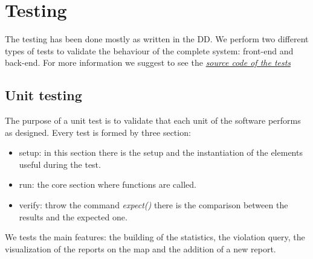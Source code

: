 \documentclass[../ITD.tex]{subfiles}
\begin{document}
    \chapter{Testing}\label{ch:testing}
    The testing has been done mostly as written in the DD. We perform two different types of tests to validate the behaviour of the complete system: front-end and back-end.
    \newline For more information we suggest to see the \href{https://github.com/fedy97/MorrealeMaddesInnocente/tree/master/safe_streets/test}{\emph{source code of the tests}}
    \section{Unit testing}\label{sec:unit-testing}
    The purpose of a unit test is to validate that each unit of the software performs as designed.
    \newline Every test is formed by three section:
    \begin{itemize}
        \item setup: in this section there is the setup and the instantiation of the elements useful during the test.
        \item run: the core section where functions are called.
        \item verify: throw the command \textit{expect()} there is the comparison between the results and the expected one.
    \end{itemize}
    We tests the main features: the building of the statistics, the violation query, the visualization of the reports on the map and the addition of a new report.
\end{document}
